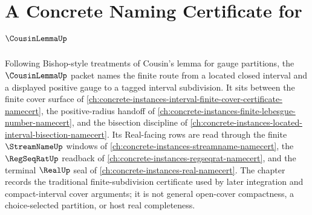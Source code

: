 \chapter{A Concrete Naming Certificate for $\CousinLemmaUp$}
\label{ch:concrete-instances-cousin-lemma-namecert}

Following Bishop-style treatments of Cousin's lemma for gauge partitions, the $\CousinLemmaUp$ packet names the finite route from a located closed interval and a displayed positive gauge to a tagged interval subdivision. It sits between the finite cover surface of \autoref{ch:concrete-instances-interval-finite-cover-certificate-namecert}, the positive-radius handoff of \autoref{ch:concrete-instances-finite-lebesgue-number-namecert}, and the bisection discipline of \autoref{ch:concrete-instances-located-interval-bisection-namecert}. Its Real-facing rows are read through the finite $\StreamNameUp$ windows of \autoref{ch:concrete-instances-streamname-namecert}, the $\RegSeqRatUp$ readback of \autoref{ch:concrete-instances-regseqrat-namecert}, and the terminal $\RealUp$ seal of \autoref{ch:concrete-instances-real-namecert}. The chapter records the traditional finite-subdivision certificate used by later integration and compact-interval cover arguments; it is not general open-cover compactness, a choice-selected partition, or host real completeness.

